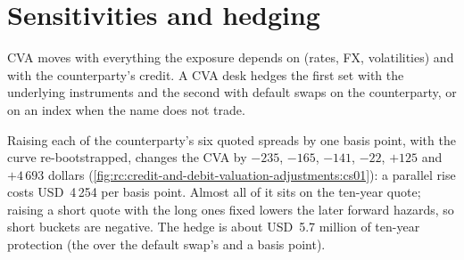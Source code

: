 \begin{omfigure}

\label{fig:rc:credit-and-debit-valuation-adjustments:wwr}
\end{omfigure}

\section{Sensitivities and hedging}

CVA moves with everything the exposure depends on (rates, FX, volatilities) and with the
counterparty's credit. A CVA desk hedges the first set with the underlying instruments and
the second with default swaps on the counterparty, or on an index when the name does not
trade.

\begin{example}[Bucketed CS01]\label{ex:rc:credit-and-debit-valuation-adjustments:cs01}
Raising each of the counterparty's six quoted spreads by one basis point, with the curve
re-bootstrapped, changes the CVA by $-235$, $-165$, $-141$, $-22$, $+125$ and $+4\,693$ dollars
(\cref{fig:rc:credit-and-debit-valuation-adjustments:cs01}): a parallel rise costs
USD~4\,254 per basis point. Almost all of it sits on the ten-year quote; raising a short quote
with the long ones fixed lowers the later forward hazards, so short buckets are negative.
The hedge is about USD~5.7 million of ten-year protection (the  over the default swap's
 and a basis point).
\end{example}

